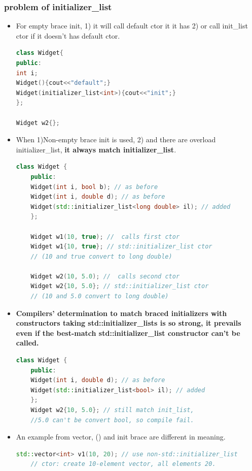 \documentclass[a4paper,12pt,twoside]{book}
\begin{document}
	\subsubsection{problem of initializer\_list}
	
\begin{itemize}

\item For empty brace init, 1) it will call default ctor it it has 2) or call init\_list ctor if it doesn't has default ctor. 

\begin{lstlisting}[frame=single, language=c++,mathescape=true]
class Widget{
public:
int i;
Widget(){cout<<"default";}
Widget(initializer_list<int>){cout<<"init";}
};

Widget w2{}; 
\end{lstlisting}

	\item When 1)Non-empty brace init is used, 2) and there are overload initializer\_list, \textbf{it always match initializer\_list}.
	\begin{lstlisting}[frame=single, language=c++,mathescape=true]
	class Widget {
	public:
	Widget(int i, bool b); // as before
	Widget(int i, double d); // as before
	Widget(std::initializer_list<long double> il); // added
	};
	
	Widget w1(10, true); //  calls first ctor
	Widget w1{10, true}; // std::initializer_list ctor
	// (10 and true convert to long double)
	
	Widget w2(10, 5.0); //  calls second ctor
	Widget w2{10, 5.0}; // std::initializer_list ctor
	// (10 and 5.0 convert to long double)
	\end{lstlisting}
	
	\item \textbf{ Compilers' determination to match braced initializers with constructors taking std::initializer\_lists is so strong, it prevails even if the best-match std::initializer\_list constructor can't be called.}
	\begin{lstlisting}[frame=single, language=c++,mathescape=true]
	class Widget {
	public:
	Widget(int i, double d); // as before
	Widget(std::initializer_list<bool> il); // added
	};
	Widget w2{10, 5.0}; // still match init_list,
	//5.0 can't be convert bool, so compile fail.
	\end{lstlisting}
	
	\item An example from vector, () and init brace are different in meaning.
	\begin{lstlisting}[frame=single, language=c++,mathescape=true]
	std::vector<int> v1(10, 20); // use non-std::initializer_list
	// ctor: create 10-element vector, all elements 20.
	

\end{lstlisting}
\end{itemize}
\end{document}
